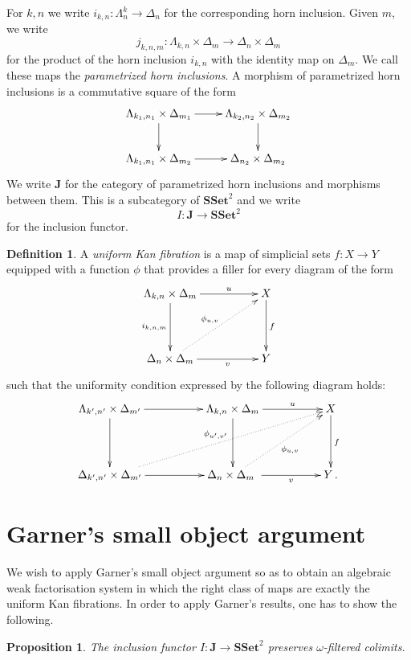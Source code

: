 \documentclass[reqno,10pt,a4paper,oneside]{amsart}
\newtheorem{proposition}[theorem]{Proposition}
\theoremstyle{definition}
\newtheorem{definition}[theorem]{Definition}
\newcommand{\co}{\colon}
\newcommand{\SSet}{\mathbf{SSet}}
\begin{document}
For $k, n$ we write $i_{k,n} \co \Lambda^k_n \to \Delta_n$ for the corresponding horn inclusion. Given 
$m$, we write 
\[
j_{k,n,m} \co \Lambda_{k,n} \times \Delta_m \to \Delta_n \times \Delta_m
\] 
for the 
product of the horn inclusion $i_{k,n}$ with the identity map on $\Delta_m$. We call these maps the
\emph{parametrized horn inclusions}. A morphism of parametrized horn inclusions is a commutative square
of the form
\[
\xymatrix{
 \Lambda_{k_1,n_1} \times \Delta_{m_1} \ar[r] \ar[d] &  \Lambda_{k_2,n_2} \times \Delta_{m_2} \ar[d] \\
 \Lambda_{k_1,n_1} \times \Delta_{m_2} \ar[r] &   \Delta_{n_2} \times \Delta_{m_2}}
 \]
We write $\mathbf{J}$ for the category of parametrized horn inclusions and morphisms between them. This is a subcategory of $\SSet^2$ and we write
\[
 I \co \mathbf{J} \to \SSet^2
 \]
 for the inclusion functor.
 
 \begin{definition} A \emph{uniform Kan fibration} is a map of simplicial sets $f \co X \to Y$ 
 equipped with a function $\phi$ that provides a filler for every diagram of the form
 \[
\xymatrix@C=1.8cm@R=1.5cm{
 \Lambda_{k,n} \times \Delta_m \ar[r]^-u \ar[d]_{i_{k,n,m}} & X \ar[d]^f \\
 \Delta_{n} \times \Delta_m \ar[r]_-v  \ar@{.>}[ur]^{\phi_{u,v}}&  Y}
 \]
 such that the uniformity condition  expressed by the following diagram holds:
 \[
\xymatrix@C=1.8cm@R=1.5cm{
 \Lambda_{k',n'} \times \Delta_{m'} \ar[r] \ar[d] &  \Lambda_{k,n} \times \Delta_m \ar[d] \ar[r]^-u & X \ar[d]^{f}  \\
\Delta_{k',n'} \times \Delta_{m'} \ar[r]  \ar@{.>}[urr]^{\phi_{u',v'}} &   \Delta_{n} \times \Delta_{m}  \ar[r]_-v \
 \ar@{.>}[ur]_{\phi_{u,v}}
 & Y \, .}
 \]
 \end{definition}

 
 
 \section{Garner's small object argument}
 
 
 
 
 
 
 We wish to apply Garner's small object argument so as to obtain an algebraic weak factorisation system
 in which the right class of maps are exactly the uniform Kan fibrations.  In order to apply Garner's results, one has to show the following.
 
 \begin{proposition} The inclusion functor $I \co \mathbf{J} \to \SSet^2$ preserves $\omega$-filtered 
 colimits.
 \end{proposition} 
 
\end{document}
